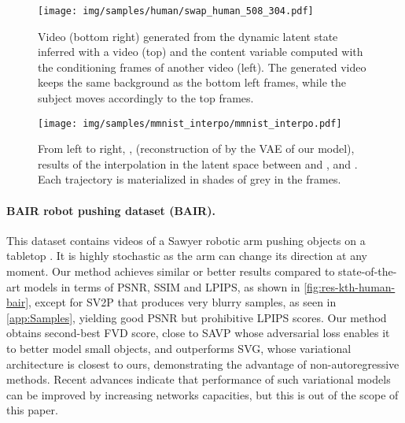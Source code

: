 \documentclass{article}
\begin{document}
\begin{figure}
    \centering
    \texttt{[image: img/samples/human/swap\_human\_508\_304.pdf]}
    \vspace{-0.2in}
    \caption{
        \label{fig:human-content-swap-1}
        Video (bottom right) generated from the dynamic latent state  inferred with a video (top) and the content variable  computed with the conditioning frames of another video (left).
        The generated video keeps the same background as the bottom left frames, while the subject moves accordingly to the top frames.
    }
    \vspace{-0.13in}
\end{figure}
 
\begin{figure*}
    \centering
    \texttt{[image: img/samples/mmnist\_interpo/mmnist\_interpo.pdf]}
    \vspace{-0.2in}
    \caption{
        \label{fig:mnist-interpolation-1}
        From left to right, ,  (reconstruction of  by the VAE of our model), results of the interpolation in the latent space between  and ,  and .
        Each trajectory is materialized in shades of grey in the frames.
    }
    \vspace{-0.03in}
\end{figure*}
 
\paragraph{BAIR robot pushing dataset (BAIR).}

This dataset contains videos of a Sawyer robotic arm pushing objects on a tabletop \citep{Ebert2017}.
It is highly stochastic as the arm can change its direction at any moment.
Our method achieves similar or better results compared to state-of-the-art models in terms of PSNR, SSIM and LPIPS, as shown in \cref{fig:res-kth-human-bair}, except for SV2P that produces very blurry samples, as seen in \cref{app:Samples}, yielding good PSNR but prohibitive LPIPS scores.
Our method obtains second-best FVD score, close to SAVP whose adversarial loss enables it to better model small objects, and outperforms SVG, whose variational architecture is closest to ours, demonstrating the advantage of non-autoregressive methods.
Recent advances \citep{Villegas2019} indicate that performance of such variational models can be improved by increasing networks capacities, but this is out of the scope of this paper.
\end{document}
